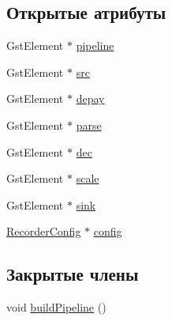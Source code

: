\subsection*{Открытые атрибуты}
\begin{DoxyCompactItemize}
\item 
Gst\+Element $\ast$ \hyperlink{class_recorder_player_afa8d3c3ed7c47d50aebaa0706b3b81b9}{pipeline}
\item 
Gst\+Element $\ast$ \hyperlink{class_recorder_player_a9d7939305cd8972f5c14ba3faff82488}{src}
\item 
Gst\+Element $\ast$ \hyperlink{class_recorder_player_aac0114349529d713c16b6efb4458fc6f}{depay}
\item 
Gst\+Element $\ast$ \hyperlink{class_recorder_player_a0e6d094f8295cefc578b76b55575efe5}{parse}
\item 
Gst\+Element $\ast$ \hyperlink{class_recorder_player_a260ebe2ca2863452605bfcbb8c7db315}{dec}
\item 
Gst\+Element $\ast$ \hyperlink{class_recorder_player_a95c63aaccc7881e10b50b6f3020eeb3b}{scale}
\item 
Gst\+Element $\ast$ \hyperlink{class_recorder_player_a66c0560426b8ce256c4a1d5a930fbc5b}{sink}
\item 
\hyperlink{class_recorder_config}{Recorder\+Config} $\ast$ \hyperlink{class_recorder_player_a9ad3716db3ce5c242a94eba40f74e059}{config}
\end{DoxyCompactItemize}
\subsection*{Закрытые члены}
\begin{DoxyCompactItemize}
\item 
void \hyperlink{class_recorder_player_a2406c730cc930fb3aa800142c041a950}{build\+Pipeline} ()
\end{DoxyCompactItemize}

